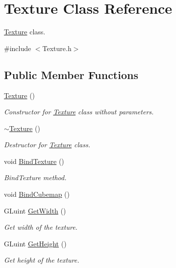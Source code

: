\hypertarget{class_texture}{}\section{Texture Class Reference}
\label{class_texture}


\mbox{\hyperlink{class_texture}{Texture}} class.  




{\ttfamily \#include $<$Texture.\+h$>$}

\subsection*{Public Member Functions}
\begin{DoxyCompactItemize}
\item 
\mbox{\hyperlink{class_texture_a6c275e3f186675ff6ed73ccf970e552f}{Texture}} ()
\begin{DoxyCompactList}\small\item\em Constructor for \mbox{\hyperlink{class_texture}{Texture}} class without parameters. \end{DoxyCompactList}\item 
\mbox{\hyperlink{class_texture_a09c4bcb7462f64c1d20fa69dba3cee8a}{$\sim$\+Texture}} ()
\begin{DoxyCompactList}\small\item\em Destructor for \mbox{\hyperlink{class_texture}{Texture}} class. \end{DoxyCompactList}\item 
void \mbox{\hyperlink{class_texture_a23465d14b76deef9cf22c14a97040f52}{Bind\+Texture}} ()
\begin{DoxyCompactList}\small\item\em Bind\+Texture method. \end{DoxyCompactList}\item 
void \mbox{\hyperlink{class_texture_a34a98124de12bc104a81663322b2d1d9}{Bind\+Cubemap}} ()
\item 
G\+Luint \mbox{\hyperlink{class_texture_af1186a3204c49bf2a8cd09550299b0c9}{Get\+Width}} ()
\begin{DoxyCompactList}\small\item\em Get width of the texture. \end{DoxyCompactList}\item 
G\+Luint \mbox{\hyperlink{class_texture_a9313d6712c3af10b467db3b7c3d5a230}{Get\+Height}} ()
\begin{DoxyCompactList}\small\item\em Get height of the texture. \end{DoxyCompactList}\item 

\end{DoxyCompactItemize}
